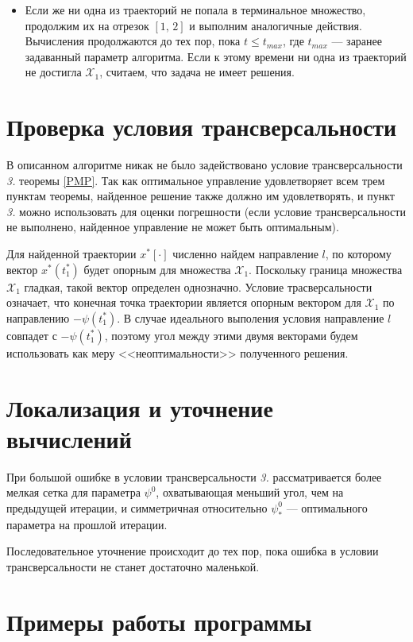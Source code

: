 \documentclass[11pt]{article}
\newcommand\X{\mathcal{X}}
\begin{document}
\begin{itemize}
\item Если же ни одна из траекторий не попала в терминальное множество, продолжим их на отрезок
$[1, \, 2]$ и выполним аналогичные действия. Вычисления продолжаются до тех пор, пока $t \le t_{max}$,
где $t_{max}$ --- заранее задаванный параметр алгоритма. Если к этому времени ни одна из траекторий
не достигла $\X_1$, считаем, что задача не имеет решения.

\end{itemize}

\newpage
\section{Проверка условия трансверсальности}
В описанном алгоритме никак не было задействовано условие трансверсальности \textit{3.} теоремы 
\ref{PMP}. Так как оптимальное управление удовлетворяет всем трем пунктам теоремы, найденное
решение также должно им удовлетворять, и пункт \textit{3.} можно использовать для оценки
погрешности (если условие трансверсальности не выполнено, найденное управление не может быть
оптимальным).

Для найденной траектории $x^*[\cdot]$ численно найдем направление $l$, по которому вектор 
$x^*(t_1^*)$ будет  опорным для множества $\X_1$. Поскольку граница множества $\X_1$ гладкая, 
такой вектор определен однозначно. Условие трасверсальности означает, что конечная точка траектории
является опорным вектором для $\X_1$ по направлению $-\psi(t_1^*)$. В случае идеального выполения
условия направление $l$ совпадет с $-\psi(t_1^*)$, поэтому угол между этими двумя векторами будем
использовать как меру <<неоптимальности>> полученного решения.

\newpage
\section{Локализация и уточнение вычислений}

При большой ошибке в условии трансверсальности \textit{3.} рассматривается более мелкая сетка для
параметра $\psi^0$, охватывающая меньший угол, чем на предыдущей итерации, и симметричная относительно
$\psi^0_*$ --- оптимального параметра на прошлой итерации.

Последовательное уточнение происходит до тех пор, пока ошибка в условии трансверсальности не 
станет достаточно маленькой.

\newpage
\section{Примеры работы программы}
\end{document}
